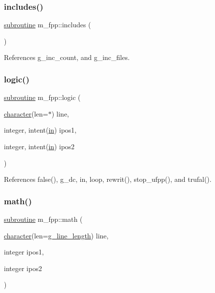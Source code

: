 \subsubsection{\texorpdfstring{includes()}{includes()}}
{\footnotesize\ttfamily \hyperlink{M__stopwatch_83_8txt_acfbcff50169d691ff02d4a123ed70482}{subroutine} m\+\_\+fpp\+::includes (\begin{DoxyParamCaption}{ }\end{DoxyParamCaption})}



References g\+\_\+inc\+\_\+count, and g\+\_\+inc\+\_\+files.

\mbox{\label{namespacem__fpp_ae036546bab009c772421d3f4e34ca93c}} 
\subsubsection{\texorpdfstring{logic()}{logic()}}
{\footnotesize\ttfamily \hyperlink{M__stopwatch_83_8txt_acfbcff50169d691ff02d4a123ed70482}{subroutine} m\+\_\+fpp\+::logic (\begin{DoxyParamCaption}\item[{\hyperlink{option__stopwatch_83_8txt_abd4b21fbbd175834027b5224bfe97e66}{character}(len=$\ast$)}]{line,  }\item[{integer, intent(\hyperlink{M__journal_83_8txt_afce72651d1eed785a2132bee863b2f38}{in})}]{ipos1,  }\item[{integer, intent(\hyperlink{M__journal_83_8txt_afce72651d1eed785a2132bee863b2f38}{in})}]{ipos2 }\end{DoxyParamCaption})}



References false(), g\+\_\+dc, in, loop, rewrit(), stop\+\_\+ufpp(), and trufal().

\mbox{\label{namespacem__fpp_a7fe1c908c17895ebaa5afc2dc4cd1f1f}} 
\subsubsection{\texorpdfstring{math()}{math()}}
{\footnotesize\ttfamily \hyperlink{M__stopwatch_83_8txt_acfbcff50169d691ff02d4a123ed70482}{subroutine} m\+\_\+fpp\+::math (\begin{DoxyParamCaption}\item[{\hyperlink{option__stopwatch_83_8txt_abd4b21fbbd175834027b5224bfe97e66}{character}(len=\hyperlink{namespacem__fpp_ab93f8756cf248cf8db932573009d4664}{g\+\_\+line\+\_\+length})}]{line,  }\item[{integer}]{ipos1,  }\item[{integer}]{ipos2 }\end{DoxyParamCaption})}



